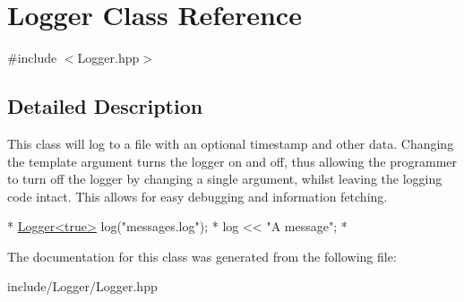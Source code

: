 \hypertarget{class_logger}{\section{Logger Class Reference}
\label{class_logger}
}


{\ttfamily \#include $<$Logger.\-hpp$>$}



\subsection{Detailed Description}
This class will log to a file with an optional timestamp and other data. Changing the template argument turns the logger on and off, thus allowing the programmer to turn off the logger by changing a single argument, whilst leaving the logging code intact. This allows for easy debugging and information fetching.


\begin{DoxyCode}
*  \hyperlink{class_logger}{Logger<true>} log(\textcolor{stringliteral}{"messages.log"});
*  log << \textcolor{stringliteral}{"A message"};
*  
\end{DoxyCode}
 

The documentation for this class was generated from the following file\-:\begin{DoxyCompactItemize}
\item 
include/\-Logger/Logger.\-hpp\end{DoxyCompactItemize}
